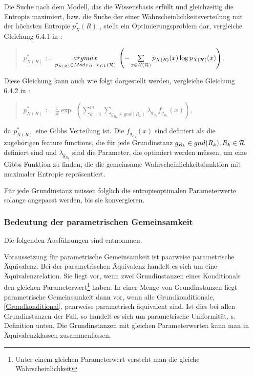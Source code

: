 \documentclass[a4paper, 11pt]{book}
\begin{document}
Die Suche nach dem Modell, das die Wissensbasis erfüllt und gleichzeitig die Entropie maximiert, bzw. die Suche der einer Wahrscheinlichkeitsverteilung mit der höchsten Entropie $ p^*_X(R) $ , stellt ein Optimierungsproblem dar, vergleiche Gleichung 6.4.1 in \cite{Fis10}:
\begin{quote}
$ p^{*}_{X(R)} $ := $ \underset{p_{X(\cal{R})}\in Mod_{FO-PCL}(\cal{R})}{argmax} $
$ \left(- \sum\limits_{x \in \cal{X(R)}}p_{X(R)}(x)\log p_{X(\cal{R})} (x)\right) $$ $.\\
\end{quote}
Diese Gleichung kann auch wie folgt dargestellt werden, vergleiche Gleichung 6.4.2 in \cite{Fis10}:
\begin{quote}
$ p^{*}_{X(R)} $ := $ \frac{1}{Z} \exp $
$ \left(\sum\limits_{k=1}^{m} \sum\limits_{g_{R_{k}} \in gnd(R_{k})} \lambda_{g_{R_{k}}} f_{g_{R_{k}}}(x)\right) $$ $,\\
\end{quote}
da $ p^{*}_{X(R)} $ eine Gibbs Verteilung ist. Die $ f_{g_{R_{k}}}(x) $ sind definiert als die zugehörigen feature functions, die für jede Grundinstanz $ g_{R_{k}} \in gnd(R_{k}), R_{k} \in \cal{R} $ definiert sind und $ \lambda_{g_{R_{k}}}  $ sind die Parameter, die optimiert werden müssen, um eine Gibbs Funktion zu finden, die die gemeinsame Wahrscheinlichkeitsfunktion mit maximaler Entropie repräsentiert.

Für jede Grundinstanz müssen folglich die entropieoptimalen Parameterwerte solange angepasst werden, bis sie konvergieren. 

\subsubsection{Bedeutung der parametrischen Gemeinsamkeit}  
\label{sec:parÄ}
Die folgenden Ausführungen sind \cite[Kap. 7.1, S. 148ff]{Fis10} entnommen.

Voraussetzung für parametrische Gemeinsamkeit ist paarweise parametrische Äquivalenz.  Bei der parametrischen Äquivalenz  handelt es sich um eine Äquivalenzrelation. Sie liegt vor, wenn zwei Grundinstanzen eines Konditionals den gleichen Parameterwert\footnote{Unter einem gleichen Parameterwert versteht man die gleiche Wahrscheinlichkeit} haben. In einer Menge von Grundinstanzen liegt parametrische Gemeinsamkeit dann vor, wenn alle Grundkonditionale, \ref{Grundkonditional},  paarweise parametrisch äquivalent sind. Ist dies bei allen Grundinstanzen der Fall, so handelt es sich um parametrische Uniformität, s. Definition unten.
Die Grundinstanzen mit gleichen Parameterwerten kann man in Äquivalenzklassen zusammenfassen. 
\end{document}
